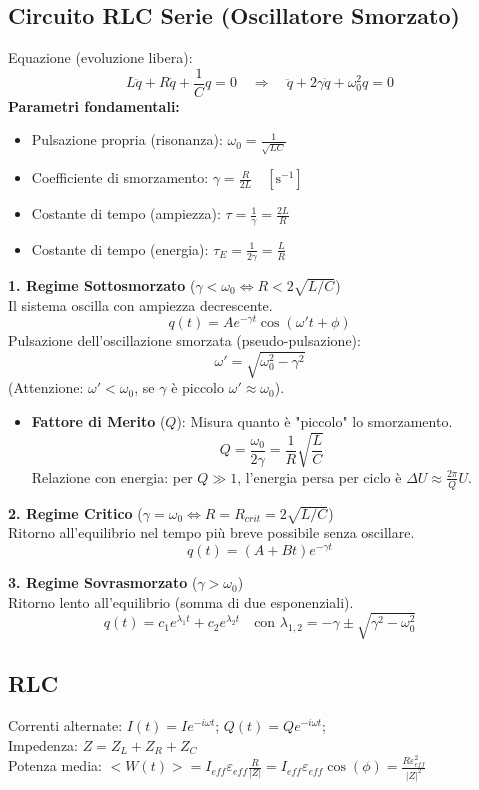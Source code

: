 \documentclass{book}
\begin{document}
\subsection*{Circuito RLC Serie (Oscillatore Smorzato)}
Equazione (evoluzione libera):
\[ L\ddot{q} + R\dot{q} + \frac{1}{C}q = 0 \quad \Longrightarrow \quad \ddot{q} + 2\gamma\dot{q} + \omega_0^2 q = 0 \]
\textbf{Parametri fondamentali:}
\begin{itemize}[noitemsep]
    \item Pulsazione propria (risonanza): $\omega_0 = \frac{1}{\sqrt{LC}}$
    \item Coefficiente di smorzamento: $\gamma = \frac{R}{2L} \quad [\mathrm{s^{-1}}]$
    \item Costante di tempo (ampiezza): $\tau = \frac{1}{\gamma} = \frac{2L}{R}$
    \item Costante di tempo (energia): $\tau_E = \frac{1}{2\gamma} = \frac{L}{R}$
\end{itemize}

\textbf{1. Regime Sottosmorzato} ($\gamma < \omega_0 \iff R < 2\sqrt{L/C}$)\\
Il sistema oscilla con ampiezza decrescente.
\[ q(t) = A e^{-\gamma t} \cos(\omega' t + \phi) \]
Pulsazione dell'oscillazione smorzata (pseudo-pulsazione):
\[ \omega' = \sqrt{\omega_0^2 - \gamma^2} \]
(Attenzione: $\omega' < \omega_0$, se $\gamma$ è piccolo $\omega' \approx \omega_0$).

\begin{itemize}
    \item \textbf{Fattore di Merito} ($Q$):
    Misura quanto è "piccolo" lo smorzamento.
    \[ Q = \frac{\omega_0}{2\gamma} = \frac{1}{R}\sqrt{\frac{L}{C}} \]
    Relazione con energia: per $Q \gg 1$, l'energia persa per ciclo è $\Delta U \approx \frac{2\pi}{Q} U$.
\end{itemize}

\textbf{2. Regime Critico} ($\gamma = \omega_0 \iff R = R_{crit} = 2\sqrt{L/C}$)\\
Ritorno all'equilibrio nel tempo più breve possibile senza oscillare.
\[ q(t) = (A + Bt)e^{-\gamma t} \]

\textbf{3. Regime Sovrasmorzato} ($\gamma > \omega_0$)\\
Ritorno lento all'equilibrio (somma di due esponenziali).
\[ q(t) = c_1 e^{\lambda_1 t} + c_2 e^{\lambda_2 t} \quad \text{con } \lambda_{1,2} = -\gamma \pm \sqrt{\gamma^2 - \omega_0^2} \]



\subsection*{RLC}
Correnti alternate: 
$I(t)=Ie^{-i\omega t} $; $ Q(t) = Q e^{-i\omega t}$;\\ 
Impedenza:
$ Z = Z_L +Z_R + Z_C $\\
Potenza media:
$
<W(t)> = I_{eff}\varepsilon_{eff} \frac{R}{|Z|}=  I_{eff}\varepsilon_{eff}  \cos(\phi) = \frac{R \varepsilon^2_{eff}}{|Z|^2}
$\\
\end{document}
